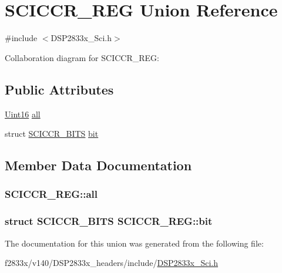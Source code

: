 \hypertarget{union_s_c_i_c_c_r___r_e_g}{}\section{S\+C\+I\+C\+C\+R\+\_\+\+R\+E\+G Union Reference}
\label{union_s_c_i_c_c_r___r_e_g}


{\ttfamily \#include $<$D\+S\+P2833x\+\_\+\+Sci.\+h$>$}



Collaboration diagram for S\+C\+I\+C\+C\+R\+\_\+\+R\+E\+G\+:
\subsection*{Public Attributes}
\begin{DoxyCompactItemize}
\item 
\hyperlink{_d_s_p2833x___device_8h_a59a9f6be4562c327cbfb4f7e8e18f08b}{Uint16} \hyperlink{union_s_c_i_c_c_r___r_e_g_a50cde7056cb5efec178b0ab523194b93}{all}
\item 
struct \hyperlink{struct_s_c_i_c_c_r___b_i_t_s}{S\+C\+I\+C\+C\+R\+\_\+\+B\+I\+T\+S} \hyperlink{union_s_c_i_c_c_r___r_e_g_ace4f4ba6e7a13f1a9db20e6605a786bd}{bit}
\end{DoxyCompactItemize}


\subsection{Member Data Documentation}
\hypertarget{union_s_c_i_c_c_r___r_e_g_a50cde7056cb5efec178b0ab523194b93}{}
\subsubsection[{all}]{ S\+C\+I\+C\+C\+R\+\_\+\+R\+E\+G\+::all}\label{union_s_c_i_c_c_r___r_e_g_a50cde7056cb5efec178b0ab523194b93}
\hypertarget{union_s_c_i_c_c_r___r_e_g_ace4f4ba6e7a13f1a9db20e6605a786bd}{}
\subsubsection[{bit}]{\setlength{\rightskip}{0pt plus 5cm}struct {\bf S\+C\+I\+C\+C\+R\+\_\+\+B\+I\+T\+S} S\+C\+I\+C\+C\+R\+\_\+\+R\+E\+G\+::bit}\label{union_s_c_i_c_c_r___r_e_g_ace4f4ba6e7a13f1a9db20e6605a786bd}


The documentation for this union was generated from the following file\+:\begin{DoxyCompactItemize}
\item 
f2833x/v140/\+D\+S\+P2833x\+\_\+headers/include/\hyperlink{_d_s_p2833x___sci_8h}{D\+S\+P2833x\+\_\+\+Sci.\+h}\end{DoxyCompactItemize}

